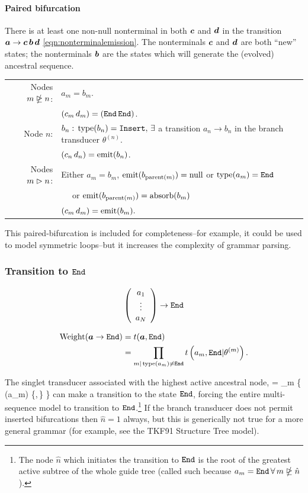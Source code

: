 \documentclass[10pt]{article}
\begin{document}
\paragraph{Paired bifurcation}
There is at least one non-null nonterminal in both $\bvec{c}$ and $\bvec{d}$ in the transition $\bvec{a} \to \bvec{c}\,\bvec{b}\,\bvec{d}$ \eqref{eqn:nonterminalemission}.
The nonterminals $\bvec{c}$ and $\bvec{d}$ are both ``new'' states;
the nonterminals $\bvec{b}$ are the states which will generate the (evolved) ancestral sequence.

\begin{tabular}{rl}
  Nodes $\mNDEn$: & $a_m = b_m$. \\
  & $(c_m\,d_m) = (\Send\,\Send)$. \\
  Node $n$: & $b_n:\,\type(b_n) = \Sinsert,\,\exists$ a transition $a_n \to b_n$ in the branch transducer $\theta^{(n)}$. \\
  & $(c_n\,d_n) = \emit(b_n)$. \\
  Nodes $\mDn$: & Either $a_m = b_m$, $\emit(b_{\parent(m)}) = \Tnull$ or $\type(a_m) = \Send$ \\
  & $\quad$ or $\emit(b_{\parent(m)}) = \absorb(b_m)$ \\
  & $(c_m\,d_m) = \emit(b_m) . $
\end{tabular}

This paired-bifurcation is included for completeness--for example, it could be used to model symmetric loops--but it
increases the complexity of grammar parsing.



\subsubsection*{Transition to $\Send$}
\[ \statevec{a} \to \Send \]

\begin{align} \label{eqn:transtoend}
  \weight(\bvec{a}\to\Send) &=  t(\bvec{a},\Send) \\
  &= \prod_{m|\type(a_m)\ne\Send} \transweight{m}{a_m}{\Send} .
\end{align}

The singlet transducer associated with the highest active ancestral node,
\beqn
{} = \argmin_m \left\{ \type(a_m) \in \{\Sstart,\,\Sinsert\} \right\}
\eeqn
can make a transition to the state $\Send$,
forcing the entire multi-sequence model to transition to $\Send$.\footnote{The node $\hat{n}$ which initiates the transition to $\Send$ 
is the root of the greatest active subtree of the whole guide tree (called such because $a_m = \Send \, \forall \, m \ntrianglerighteq \hat{n}$).}
If the branch transducer does not permit inserted bifurcations then $\hat{n} = 1$ always,
but this is generically not true for a more general grammar
(for example, see the TKF91 Structure Tree model).
\end{document}

